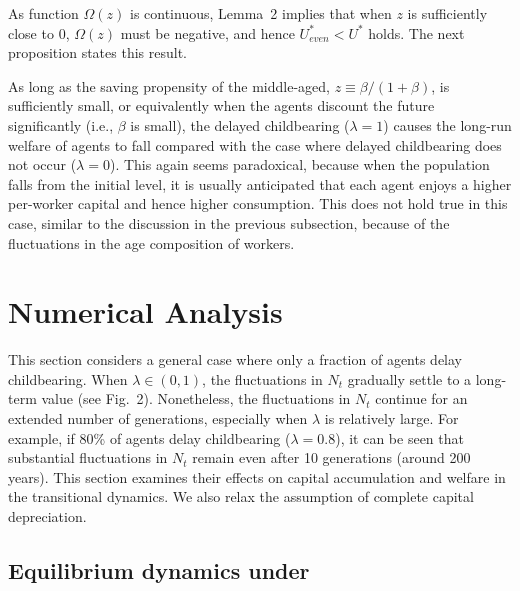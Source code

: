 \documentclass[nogrid]{MBE}%
\begin{document}
{As function $\Omega(z)$ is continuous, Lemma~2 implies that when $z$ is sufficiently close to $0$,
$\Omega(z)$ must be negative, and hence $U^{*}_{even}< U^{*}$ holds. The next proposition states
this result.


As long as the saving propensity of the middle-aged, $z\equiv\beta/(1+\beta)$,
is sufficiently small, or equivalently when the agents discount the future
significantly (i.e., $\beta$ is small), the delayed childbearing ($\lambda=1$)
causes the long-run welfare of agents to fall compared with the case where
delayed childbearing does not occur ($\lambda=0$). This again seems
paradoxical, because when the population falls from the initial level, it is
usually anticipated that each agent enjoys a higher per-worker capital and
hence higher consumption. This does not hold true in this case, similar to the
discussion in the previous subsection, because of the fluctuations in the age
composition of workers.

\section{Numerical Analysis\label{sec:Numerical}}

This section considers a general case where only a fraction of agents delay childbearing. When
$\lambda\in(0,1)$, the fluctuations in $N_{t}$ gradually settle to a long-term value (see Fig.~2).
Nonetheless, the fluctuations in $N_{t}$ continue for an extended number of generations,
especially when $\lambda$ is relatively large. {For example, if 80\% of agents delay childbearing
($\lambda=0.8$), it can be seen that substantial fluctuations in $N_{t}$ remain even after 10
generations (around 200 years).} This section examines their effects on capital accumulation and
welfare in the transitional dynamics. We also relax the assumption of complete capital
depreciation.

\subsection{Equilibrium dynamics under \label{subsec:numerical_k}}

}
\end{document}
